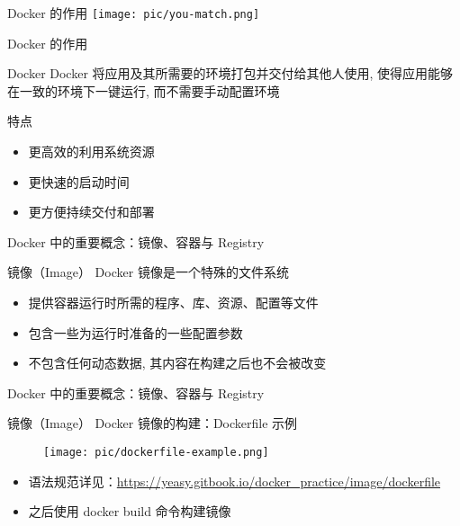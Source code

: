 \documentclass{beamer}
\begin{document}
\begin{frame}{Docker 的作用}
    \texttt{[image: pic/you-match.png]}
\end{frame}

\begin{frame}{Docker 的作用}
    \begin{block}{Docker}
       Docker 将应用及其所需要的环境打包并交付给其他人使用, 使得应用能够在一致的环境下一键运行, 而不需要手动配置环境
    \end{block}
    \begin{block}{特点}
        \begin{itemize}
            \item 更高效的利用系统资源
            \item 更快速的启动时间
            \item 更方便持续交付和部署
        \end{itemize}
    \end{block}
\end{frame}


\begin{frame}{Docker 中的重要概念：镜像、容器与 Registry}
    \begin{block}{镜像（Image）}
        Docker 镜像是一个特殊的文件系统
        \begin{itemize}
            \item 提供容器运行时所需的程序、库、资源、配置等文件
            \item 包含一些为运行时准备的一些配置参数
            \item 不包含任何动态数据, 其内容在构建之后也不会被改变
        \end{itemize}
    \end{block}
\end{frame}

\begin{frame}{Docker 中的重要概念：镜像、容器与 Registry}
    \begin{block}{镜像（Image）}
        Docker 镜像的构建：Dockerfile 示例
        \begin{figure}
            \centering
            \texttt{[image: pic/dockerfile-example.png]}
            \label{fig:my_label}
        \end{figure}
        \begin{itemize}
            \item 语法规范详见：\url{https://yeasy.gitbook.io/docker_practice/image/dockerfile}
            \item 之后使用 docker build 命令构建镜像
        \end{itemize}
    \end{block}
\end{frame}
\end{document}

